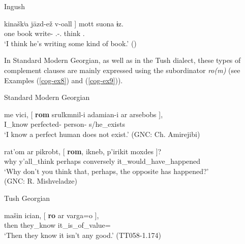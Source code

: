 	\begin{exe}
		\ex\label{cog-ex7}
		Ingush
        
		\gll {{\normalfont[} cħa}	kinaškʲa	j\={a}zd-ež	{v-oall {\normalfont]}}	mott	suona	ɨz.  \\
		one	book	write-{\Simul}	{\M}.{\Sg}-{\Lv}.{\Prog}	think	{\Fsg}.{\Dat}	{\Tsg}	    \\
		\trans `I think he's writing some kind of book.’ 
		\hfill (\cite[575]{nichols11})
	\end{exe}


In Standard Modern Georgian, as well as in the Tush dialect, these types of complement clauses are mainly expressed using the subordinator \textit{ro(m)} (see Examples (\ref{cog-ex8}) and (\ref{cog-ex9})).

\begin{exe}
	\ex\label{cog-ex8}
    Standard Modern Georgian
    \begin{xlist}
		
		
			\ex\label{cog-ex8a}
			\gll me	vici,	{{\normalfont[} \textbf{rom}}	srulkmnil-i	adamian-i	ar	{arsebobs {\normalfont]}},   \\
			{\Fsg}	I\_know	\textbf{{\Subord}}	perfected-{\Agr}	person-{\Nom}	{\Neg}	s/he\_exists	\\
			\trans `I know a perfect human does not exist.’ 
			\hfill (GNC: Ch. Amirejibi)
		
		
		
			\ex\label{cog-ex8b}
			\gll rat'om	ar	pikrobt,	{{\normalfont[} \textbf{rom}},	ikneb,	p'irikit	{moxdes {\normalfont]}}? \\	
			why	{\Neg}	y’all\_think	\textbf{{\Subord}}	perhaps	conversely	it\_would\_have\_happened	\\
			\trans `Why don’t you think that, perhaps, the opposite has happened?’ \\
			\hfill (GNC: R. Mishveladze)
		
	\end{xlist}
\end{exe}

	\begin{exe}
		\ex\label{cog-ex9}
		Tush Georgian
        
		\gll mašin	ician,	{{\normalfont[} \textbf{ro}}	ar	{varga=o {\normalfont]}},    \\
		then	they\_know	\textbf{{\Subord}}	{\Neg}	it\_is\_of\_value={\Quot}	\\
		\trans `Then they know it isn’t any good.’	
		\hfill (TT058-1.174)
	\end{exe}




